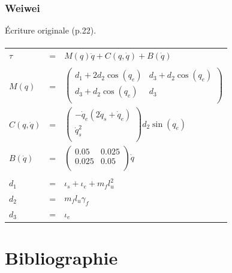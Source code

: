 \documentclass[pdftex,a4paper,11pt]{article}
\numberwithin{equation}{subsection}
\begin{document}

\subsubsection{Weiwei}
Écriture originale \cite{li2006} (p.22).

\paragraph{}
\begin{tabular}{lcl}
    $\tau$ & = & $M(q)\ddot{q} + C(q, \dot{q}) + B(\dot{q})$ \\
    \\

    $M(q)$ & = &
    $
    \begin{pmatrix}
        d_1 + 2 d_2 \cos(q_e)  & d_3 + d_2 \cos(q_e) \\
        d_3 + d_2 \cos(q_e) & d_3 \\
    \end{pmatrix}
    $ \\

    $C(q, \dot{q})$ & = &
    $
    \begin{pmatrix}
        -\dot{q}_e (2 \dot{q}_s + \dot{q}_e) \\
        \dot{q}_s^2 \\
    \end{pmatrix}
    d_2 \sin(q_e)
    $\\

    $B(\dot{q})$ & = &
    $
    \begin{pmatrix}
        0.05  & 0.025 \\
        0.025 & 0.05 \\
    \end{pmatrix}
    \dot{q}
    $ \\
    \\

    $d_1$ & = & $\iota_s + \iota_e + m_f l_u^2$ \\
    $d_2$ & = & $m_f l_u \gamma_f$ \\
    $d_3$ & = & $\iota_e$ \\
\end{tabular}


\section{Bibliographie}




\end{document}
